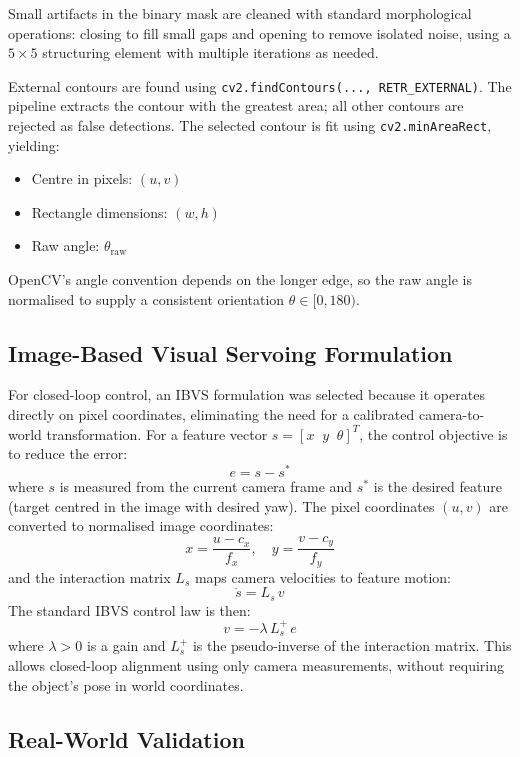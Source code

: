 Small artifacts in the binary mask are cleaned with standard morphological operations: closing to fill small gaps and opening to remove isolated noise, using a $5 \times 5$ structuring element with multiple iterations as needed.

External contours are found using \texttt{cv2.findContours(..., RETR\_EXTERNAL)}. The pipeline extracts the contour with the greatest area; all other contours are rejected as false detections. The selected contour is fit using \texttt{cv2.minAreaRect}, yielding:
\begin{itemize}
    \item Centre in pixels: $(u, v)$
    \item Rectangle dimensions: $(w, h)$
    \item Raw angle: $\theta_{\text{raw}}$
\end{itemize}

OpenCV's angle convention depends on the longer edge, so the raw angle is normalised to supply a consistent orientation $\theta \in [0, 180)$.

\subsection{Image-Based Visual Servoing Formulation}

For closed-loop control, an IBVS formulation was selected because it operates directly on pixel coordinates, eliminating the need for a calibrated camera-to-world transformation. For a feature vector $s = [x \;\; y \;\; \theta]^T$, the control objective is to reduce the error:
\[
e = s - s^{*}
\]
where $s$ is measured from the current camera frame and $s^{*}$ is the desired feature (target centred in the image with desired yaw). The pixel coordinates $(u, v)$ are converted to normalised image coordinates:
\[
x = \frac{u - c_x}{f_x}, \quad y = \frac{v - c_y}{f_y}
\]
and the interaction matrix $L_s$ maps camera velocities to feature motion:
\[
\dot{s} = L_s \, v
\]
The standard IBVS control law is then:
\[
v = -\lambda \, L_s^{+} \, e
\]
where $\lambda > 0$ is a gain and $L_s^{+}$ is the pseudo-inverse of the interaction matrix. This allows closed-loop alignment using only camera measurements, without requiring the object's pose in world coordinates.

\subsection{Real-World Validation}

